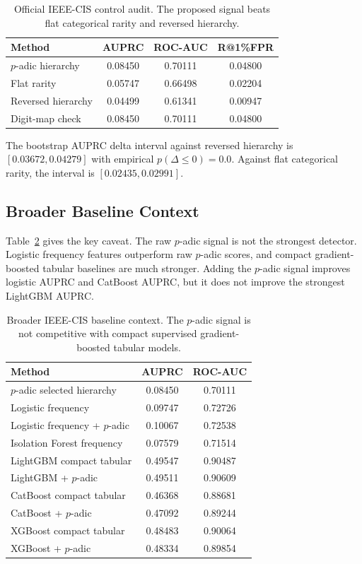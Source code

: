 \documentclass[journal]{IEEEtran}
\begin{document}
\begin{table}[!t]
\centering
\caption{Official IEEE-CIS control audit. The proposed signal beats flat categorical rarity and reversed hierarchy.}
\label{tab:controls}
\begin{tabular}{lccc}
\toprule
Method & AUPRC & ROC-AUC & R@1\%FPR \\
\midrule
$p$-adic hierarchy & 0.08450 & 0.70111 & 0.04800 \\
Flat rarity & 0.05747 & 0.66498 & 0.02204 \\
Reversed hierarchy & 0.04499 & 0.61341 & 0.00947 \\
Digit-map check & 0.08450 & 0.70111 & 0.04800 \\
\bottomrule
\end{tabular}
\end{table}

The bootstrap AUPRC delta interval against reversed hierarchy is $[0.03672,0.04279]$ with empirical $p(\Delta\leq0)=0.0$. Against flat categorical rarity, the interval is $[0.02435,0.02991]$.

\subsection{Broader Baseline Context}
Table~\ref{tab:baselines} gives the key caveat. The raw $p$-adic signal is not the strongest detector. Logistic frequency features outperform raw $p$-adic scores, and compact gradient-boosted tabular baselines are much stronger. Adding the $p$-adic signal improves logistic AUPRC and CatBoost AUPRC, but it does not improve the strongest LightGBM AUPRC.

\begin{table}[!t]
\centering
\caption{Broader IEEE-CIS baseline context. The $p$-adic signal is not competitive with compact supervised gradient-boosted tabular models.}
\label{tab:baselines}
\begin{tabular}{lcc}
\toprule
Method & AUPRC & ROC-AUC \\
\midrule
$p$-adic selected hierarchy & 0.08450 & 0.70111 \\
Logistic frequency & 0.09747 & 0.72726 \\
Logistic frequency + $p$-adic & 0.10067 & 0.72538 \\
Isolation Forest frequency & 0.07579 & 0.71514 \\
LightGBM compact tabular & 0.49547 & 0.90487 \\
LightGBM + $p$-adic & 0.49511 & 0.90609 \\
CatBoost compact tabular & 0.46368 & 0.88681 \\
CatBoost + $p$-adic & 0.47092 & 0.89244 \\
XGBoost compact tabular & 0.48483 & 0.90064 \\
XGBoost + $p$-adic & 0.48334 & 0.89854 \\
\bottomrule
\end{tabular}
\end{table}
\end{document}
